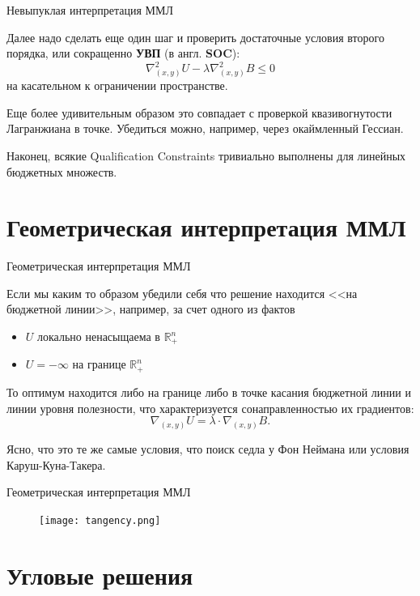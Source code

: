 \documentclass{beamer}
\begin{document}
\begin{frame}{Невыпуклая интерпретация ММЛ}

Далее надо сделать еще один шаг и проверить достаточные условия второго порядка, или сокращенно \textbf{УВП} (в англ. \textbf{SOC}):
$$ \nabla^2_{(x,y)}U - \lambda \nabla^2_{(x,y)} B \leqslant 0$$
на касательном к ограничении пространстве. 

Еще более удивительным образом это совпадает с проверкой квазивогнутости Лагранжиана в точке. Убедиться можно, например, через окаймленный Гессиан.

Наконец, всякие Qualification Constraints тривиально выполнены для линейных бюджетных множеств.

\end{frame}

\section{Геометрическая интерпретация ММЛ}

\begin{frame}{Геометрическая интерпретация ММЛ}

Если мы каким то образом убедили себя что решение находится <<на бюджетной линии>>, например, за счет одного из фактов

\begin{itemize}
  \item $U$ локально ненасыщаема в $\mathbb{R}^n_+$
  \item $U = -\infty$ на границе $\mathbb{R}^n_+$
\end{itemize}

То оптимум находится либо на границе либо \alert{в точке касания} бюджетной линии и линии уровня полезности, что характеризуется сонаправленностью их градиентов:
$$ \nabla_{(x,y)} U = \lambda \cdot \nabla_{(x,y)} B.$$

Ясно, что это те же самые условия, что поиск седла у Фон Неймана или условия Каруш-Куна-Такера.

\end{frame}

\begin{frame}{Геометрическая интерпретация ММЛ}

\begin{figure}[hbt]
\centering
\texttt{[image: tangency.png]}
\end{figure}

\end{frame}

\section{Угловые решения}
\end{document}
